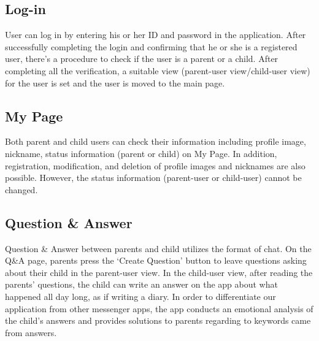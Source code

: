 \documentclass[conference]{IEEEtran}
\begin{document}
\subsection{Log-in}

User can log in by entering his or her ID and password in the application. After successfully completing the login and confirming that he or she is a registered user, there’s a procedure to check if the user is a parent or a child. After completing all the verification, a suitable view (parent-user view/child-user view) for the user is set and the user is moved to the main page.

\subsection{My Page}

Both parent and child users can check their information including profile image, nickname, status information (parent or child) on My Page. In addition, registration, modification, and deletion of profile images and nicknames are also possible. However, the status information (parent-user or child-user) cannot be changed.

\subsection{Question \& Answer}

Question \& Answer between parents and child utilizes the format of chat. On the Q\&A page, parents press the ‘Create Question’ button to leave questions asking about their child in the parent-user view. In the child-user view, after reading the parents' questions, the child can write an answer on the app about what happened all day long, as if writing a diary. In order to differentiate our application from other messenger apps, the app conducts an emotional analysis of the child's answers and provides solutions to parents regarding to keywords came from answers.
\end{document}
